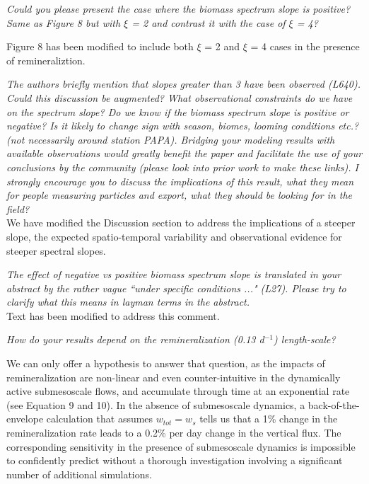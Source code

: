 \documentclass[12pt,letter]{article}
\begin{document}
\textit{Could you please present the case where the biomass spectrum slope is positive? Same as Figure 8 but with $\xi$ = 2 and contrast it with the case of $\xi$ = 4?\\}

{\color{blue}
Figure 8 has been modified to include both $\xi$ = 2 and $\xi$ = 4 cases in the presence of remineraliztion.\\}

\textit{The authors briefly mention that slopes greater than 3 have been observed (L640). Could this discussion be augmented? What observational constraints do we have on the spectrum slope? Do we know if the biomass spectrum slope is positive or negative? Is it likely to change sign with season, biomes, looming conditions etc.? (not necessarily around station PAPA). Bridging your modeling results with available observations would greatly benefit the paper and facilitate the use of your conclusions by the community (please look into prior work to make these links). I strongly encourage you to discuss the implications of this result, what they mean for people measuring particles and export, what they should be looking for in the field?}\\

{\color{blue}
	We have modified the Discussion section to address the implications of a steeper slope, the expected spatio-temporal variability and  observational evidence for steeper spectral slopes.\\}

\textit{The effect of negative vs positive biomass spectrum slope is translated in your abstract by the rather vague ``under specific conditions ..." (L27). Please try to clarify what this means in layman terms in the abstract.}\\

{\color{blue}Text has been modified to address this comment.\\}

\textit{How do your results depend on the remineralization (0.13 d$^{-1}$) length-scale? \\}

{\color{blue} We can only offer a hypothesis to answer that question, as the impacts of remineralization are non-linear and even counter-intuitive in the dynamically active submesoscale flows, and accumulate through time at an exponential rate (see Equation 9 and 10). In the absence of submesoscale dynamics, a back-of-the-envelope calculation that assumes $w_{tot} = w_{s}$ tells us that a  1\% change in the remineralization rate leads to a 0.2\% per day change in the vertical flux. The corresponding sensitivity in the presence of submesoscale dynamics is impossible to confidently predict without a thorough investigation involving a significant number of additional simulations.\\}
\end{document}
